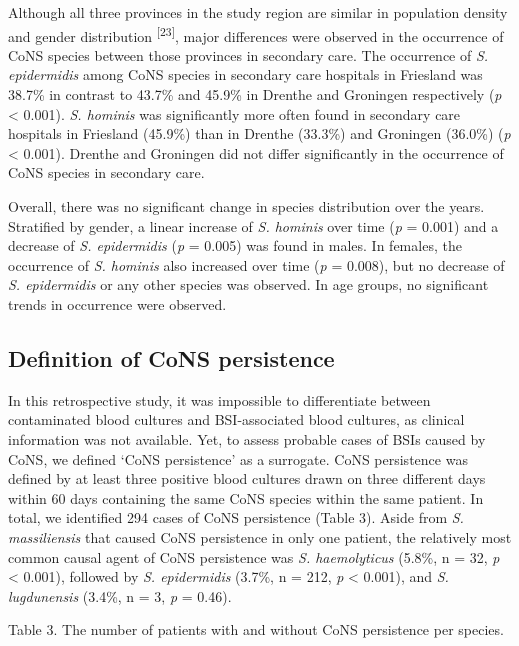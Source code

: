 \documentclass[
]{book}
\begin{document}
Although all three provinces in the study region are similar in population density and gender distribution \textsuperscript{{[}23{]}}, major differences were observed in the occurrence of CoNS species between those provinces in secondary care. The occurrence of \emph{S. epidermidis} among CoNS species in secondary care hospitals in Friesland was 38.7\% in contrast to 43.7\% and 45.9\% in Drenthe and Groningen respectively (\emph{p} \textless{} 0.001). \emph{S. hominis} was significantly more often found in secondary care hospitals in Friesland (45.9\%) than in Drenthe (33.3\%) and Groningen (36.0\%) (\emph{p} \textless{} 0.001). Drenthe and Groningen did not differ significantly in the occurrence of CoNS species in secondary care.

Overall, there was no significant change in species distribution over the years. Stratified by gender, a linear increase of \emph{S. hominis} over time (\emph{p} = 0.001) and a decrease of \emph{S. epidermidis} (\emph{p} = 0.005) was found in males. In females, the occurrence of \emph{S. hominis} also increased over time (\emph{p} = 0.008), but no decrease of \emph{S. epidermidis} or any other species was observed. In age groups, no significant trends in occurrence were observed.

\hypertarget{definition-of-cons-persistence}{%
\subsection{Definition of CoNS persistence}\label{definition-of-cons-persistence}}

In this retrospective study, it was impossible to differentiate between contaminated blood cultures and BSI-associated blood cultures, as clinical information was not available. Yet, to assess probable cases of BSIs caused by CoNS, we defined `CoNS persistence' as a surrogate. CoNS persistence was defined by at least three positive blood cultures drawn on three different days within 60 days containing the same CoNS species within the same patient. In total, we identified 294 cases of CoNS persistence (Table 3). Aside from \emph{S. massiliensis} that caused CoNS persistence in only one patient, the relatively most common causal agent of CoNS persistence was \emph{S. haemolyticus} (5.8\%, n = 32, \emph{p} \textless{} 0.001), followed by \emph{S. epidermidis} (3.7\%, n = 212, \emph{p} \textless{} 0.001), and \emph{S. lugdunensis} (3.4\%, n = 3, \emph{p} = 0.46).

Table 3. The number of patients with and without CoNS persistence per species.
\end{document}
